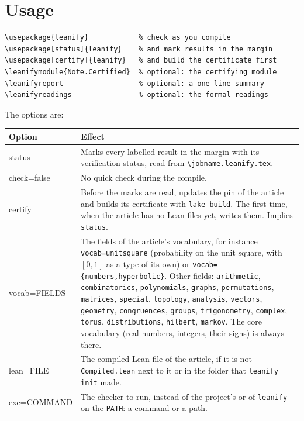 \documentclass[11pt]{article}
\newcommand*\opt[1]{\texttt{#1}}
\newcommand*\cs[1]{\texttt{\textbackslash#1}}
\begin{document}
\section{Usage}

\begin{lstlisting}
\usepackage{leanify}            % check as you compile
\usepackage[status]{leanify}    % and mark results in the margin
\usepackage[certify]{leanify}   % and build the certificate first
\leanifymodule{Note.Certified}  % optional: the certifying module
\leanifyreport                  % optional: a one-line summary
\leanifyreadings                % optional: the formal readings
\end{lstlisting}

\noindent The options are:

\medskip
\noindent\begin{tabularx}{\linewidth}{@{}>{\ttfamily}l X@{}}
\toprule
\normalfont Option & Effect \\
\midrule
status & Marks every labelled result in the margin with its verification status,
  read from \texttt{\cs{jobname}.leanify.tex}. \\
check=false & No quick check during the compile. \\
certify & Before the marks are read, updates the pin of the article and builds
  its certificate with \texttt{lake build}. The first time, when the article has
  no Lean files yet, writes them. Implies \opt{status}. \\
vocab=FIELDS & The fields of the article's vocabulary, for instance
  \texttt{vocab=unitsquare} (probability on the unit square, with $[0,1]$ as a type
  of its own) or \texttt{vocab=\{numbers,hyperbolic\}}. Other fields:
  \texttt{arithmetic}, \texttt{combinatorics}, \texttt{polynomials},
  \texttt{graphs}, \texttt{permutations}, \texttt{matrices}, \texttt{special},
  \texttt{topology}, \texttt{analysis}, \texttt{vectors}, \texttt{geometry},
  \texttt{congruences}, \texttt{groups},
  \texttt{trigonometry}, \texttt{complex}, \texttt{torus}, \texttt{distributions},
  \texttt{hilbert}, \texttt{markov}. The core vocabulary (real
  numbers, integers, their signs) is always there. \\
lean=FILE & The compiled Lean file of the article, if it is not
  \texttt{Compiled.lean} next to it or in the folder that \texttt{leanify init}
  made. \\
exe=COMMAND & The checker to run, instead of the project's or of
  \texttt{leanify} on the \texttt{PATH}: a command or a path. \\

\end{tabularx}
\end{document}
